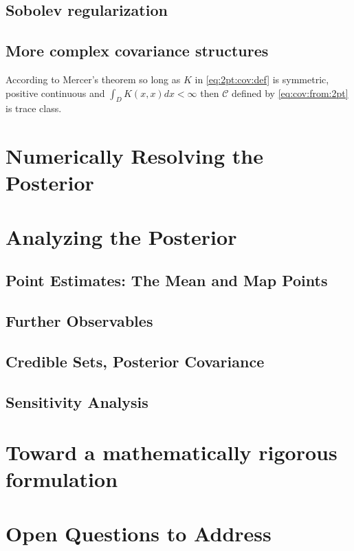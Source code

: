 \documentclass[18pt]{article}
\numberwithin{equation}{subsection}
\newcommand{\cC}{\mathcal{C}}
\begin{document}
\subsection{Sobolev regularization}

\subsection{More complex covariance structures}
According to Mercer's theorem so long as $K$ in \eqref{eq:2pt:cov:def} is symmetric, positive continuous and $\int_D K(x,x) dx < \infty$ then $\cC$ defined by 
\eqref{eq:cov:from:2pt} is trace class.
\section{Numerically Resolving the Posterior}
\label{sec:MCMC}

\section{Analyzing the Posterior}
\label{sec:Bayes:Model:Eval}

\subsection{Point Estimates: The Mean and Map Points}

\subsection{Further Observables}

\subsection{Credible Sets, Posterior Covariance}

\subsection{Sensitivity Analysis}

\section{Toward a mathematically rigorous formulation}

\section{Open Questions to Address}
\end{document}
